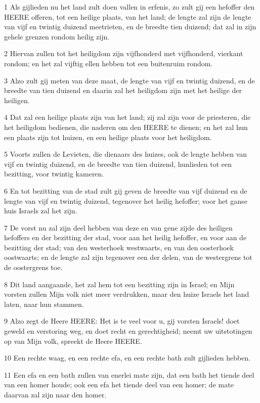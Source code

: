 \par 1 Als gijlieden nu het land zult doen vallen in erfenis, zo zult gij een hefoffer den HEERE offeren, tot een heilige plaats, van het land; de lengte zal zijn de lengte van vijf en twintig duizend meetrieten, en de breedte tien duizend; dat zal in zijn gehele grenzen rondom heilig zijn.
\par 2 Hiervan zullen tot het heiligdom zijn vijfhonderd met vijfhonderd, vierkant rondom; en het zal vijftig ellen hebben tot een buitenruim rondom.
\par 3 Alzo zult gij meten van deze maat, de lengte van vijf en twintig duizend, en de breedte van tien duizend en daarin zal het heiligdom zijn met het heilige der heiligen.
\par 4 Dat zal een heilige plaats zijn van het land; zij zal zijn voor de priesteren, die het heiligdom bedienen, die naderen om den HEERE te dienen; en het zal hun een plaats zijn tot huizen, en een heilige plaats voor het heiligdom.
\par 5 Voorts zullen de Levieten, die dienaars des huizes, ook de lengte hebben van vijf en twintig duizend, en de breedte van tien duizend, hunlieden tot een bezitting, voor twintig kameren.
\par 6 En tot bezitting van de stad zult gij geven de breedte van vijf duizend en de lengte van vijf en twintig duizend, tegenover het heilig hefoffer; voor het ganse huis Israels zal het zijn.
\par 7 De vorst nu zal zijn deel hebben van deze en van gene zijde des heiligen hefoffers en der bezitting der stad, voor aan het heilig hefoffer, en voor aan de bezitting der stad; van den westerhoek westwaarts, en van den oosterhoek oostwaarts; en de lengte zal zijn tegenover een der delen, van de westergrens tot de oostergrens toe.
\par 8 Dit land aangaande, het zal hem tot een bezitting zijn in Israel; en Mijn vorsten zullen Mijn volk niet meer verdrukken, maar den huize Israels het land laten, naar hun stammen.
\par 9 Alzo zegt de Heere HEERE: Het is te veel voor u, gij vorsten Israels! doet geweld en verstoring weg, en doet recht en gerechtigheid; neemt uw uitstotingen op van Mijn volk, spreekt de Heere HEERE.
\par 10 Een rechte waag, en een rechte efa, en een rechte bath zult gijlieden hebben.
\par 11 Een efa en een bath zullen van enerlei mate zijn, dat een bath het tiende deel van een homer houde; ook een efa het tiende deel van een homer; de mate daarvan zal zijn naar den homer.
